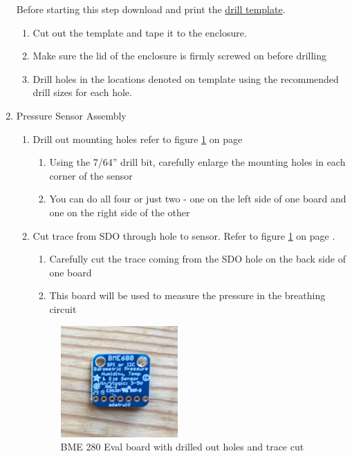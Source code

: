 \documentclass[11pt, letterpaper]{article}
\begin{document}
\begin{enumerate}
Before starting this step download and print the \href{https://github.com/PubInv/ventmon-ventilator-inline-test-monitor/blob/master/design/templates/bottomDrill03.pdf}{drill template}.

\begin{enumerate}[label=2.\arabic*]
\item
Cut out the template and tape it to the enclosure.
\item
Make sure the lid of the enclosure is firmly screwed on before drilling
\item
Drill holes in the locations denoted on template using the recommended drill sizes for each hole.
\end{enumerate}

\item
Pressure Sensor Assembly
\begin{enumerate}[label=3.\arabic*]
\item
Drill out mounting holes refer to figure \ref{fig:bme_1} on page \pageref{fig:bme_1}
\begin{enumerate}[label=3.1.\arabic*]
\item
Using the 7/64'' drill bit, carefully enlarge the mounting holes in each corner of the sensor
\item
You can do all four or just two - one on the left side of one board and one on the right side of the other
\end{enumerate}
\item
Cut trace from SDO through hole to sensor. Refer to figure \ref{fig:bme_1} on page \pageref{fig:bme_1}.
\begin{enumerate}[label=3.2.\arabic*]
\item
Carefully cut the trace coming from the SDO hole on the back side of one board
\item
This board will be used to measure the pressure in the breathing circuit
\end{enumerate}
\begin{figure}[H]
\label{fig:bme_1}
\centering
\includegraphics[width=0.45\textwidth]{bme_1.JPG}
\caption{BME 280 Eval board with drilled out holes and trace cut}
\end{figure}


\end{enumerate}
\end{enumerate}
\end{document}
